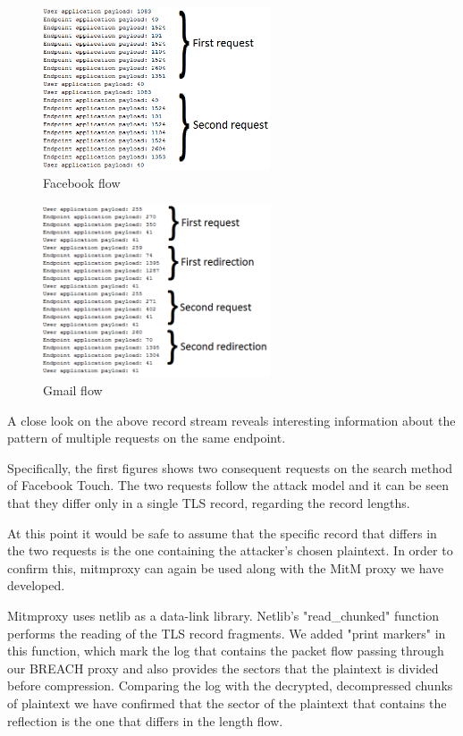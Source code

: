 \begin{figure}[H] \caption{Facebook flow} \centering
\includegraphics[width=0.6\textwidth]{diagrams/facebook_request_flow.png}\end{figure}

\begin{figure}[H] \caption{Gmail flow} \centering
\includegraphics[width=0.6\textwidth]{diagrams/gmail_request_flow.png}\end{figure}

A close look on the above record stream reveals interesting information about
the pattern of multiple requests on the same endpoint.

Specifically, the first figures shows two consequent requests on the search
method of Facebook Touch. The two requests follow the attack model and it can be
seen that they differ only in a single TLS record, regarding the record lengths.

At this point it would be safe to assume that the specific record that differs
in the two requests is the one containing the attacker's chosen plaintext. In
order to confirm this, mitmproxy can again be used along with the MitM proxy we
have developed.

Mitmproxy uses netlib as a data-link library. Netlib's "read\_chunked" function
performs the reading of the TLS record fragments. We added "print markers" in
this function, which mark the log that contains the packet flow passing through
our BREACH proxy and also provides the sectors that the plaintext is divided
before compression. Comparing the log with the decrypted, decompressed chunks of
plaintext we have confirmed that the sector of the plaintext that contains the
reflection is the one that differs in the length flow.

